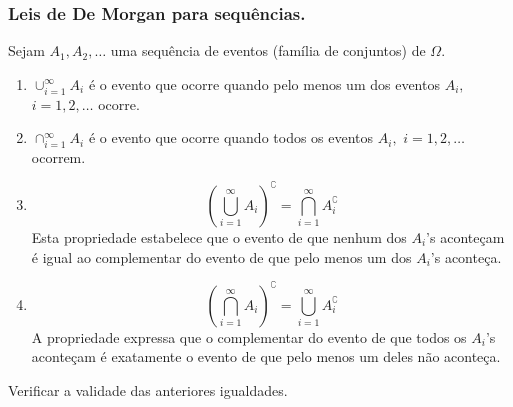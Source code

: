 \begin{frame}
 
\frametitle{Leis de De Morgan para sequências.} 

Sejam $A_1, A_2, \ldots$ uma sequência de eventos (família de conjuntos) de $\Omega.$ 

\begin{enumerate}
\item $\cup_{i=1}^\infty A_i$ é o evento que ocorre quando pelo menos um dos eventos $A_i,$ $i=1,2,\ldots$ ocorre. 

\item $\cap_{i=1}^\infty A_i$ é o evento que ocorre quando todos os eventos $A_i,$ $i=1,2,\ldots$ ocorrem.

 \item $$\displaystyle{\left(\bigcup_{i=1}^\infty A_i\right)^\complement = \bigcap_{i=1}^\infty A_i^\complement}$$ Esta propriedade estabelece que o evento de que nenhum dos $A_i$'s aconteçam é igual ao complementar do evento de que pelo menos um dos $A_i$'s aconteça.
\item $$\left(\bigcap_{i=1}^\infty A_i\right)^\complement=\bigcup_{i=1}^\infty A_i^\complement$$ A propriedade expressa que o complementar do evento de que todos os $A_i$'s aconteçam é exatamente o evento de que pelo menos um deles não aconteça.
\end{enumerate}
\begin{exer}
	Verificar a validade das anteriores igualdades.
\end{exer}	
	
\end{frame}

